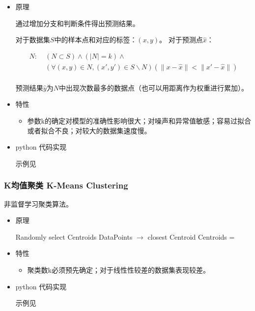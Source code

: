 \documentclass{article}
\begin{document}
\begin{itemize}

\item{原理}

通过增加分支和判断条件得出预测结果。

对于数据集$S$中的样本点和对应的标签：$(x, y)$。
对于预测点$\hat{x}$：

\[\begin{split}
    N:\; & (N \subset S) \land (|N| = k) \land\\
    & (\forall (x, y) \in N, (x', y') \in S \backslash  N)(\lVert x - \hat{x} \rVert < \lVert x' - \hat{x} \rVert)\\
\end{split}\]

预测结果$\hat{y}$为$N$中出现次数最多的数据点（也可以用距离作为权重进行累加）。

\item{特性}

\begin{itemize}
    \item 参数k的确定对模型的准确性影响很大；对噪声和异常值敏感；容易过拟合或者拟合不良；对较大的数据集速度慢。
\end{itemize}

\item{python 代码实现}

示例见

\end{itemize}

\subsubsection{K均值聚类 K-Means Clustering}

非监督学习聚类算法。

\begin{itemize}

\item{原理}

\begin{algorithmic}
    \State Randomly select Centroids
    \Repeat
    \State DataPoints $\rightarrow$ closest Centroid
    \State Centroids = 
\EndProcedure
\end{algorithmic}

\item{特性}

\begin{itemize}
    \item 聚类数k必须预先确定；对于线性性较差的数据集表现较差。
\end{itemize}

\item{python 代码实现}

示例见

\end{itemize}
\end{document}
